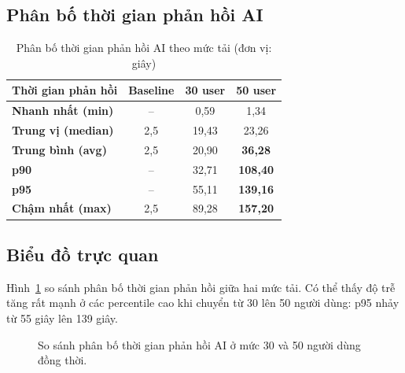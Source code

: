 \documentclass[12pt,a4paper]{article}
\newcommand{\bad}[1]{\textcolor{dangerred}{\bfseries #1}}
\begin{document}
\subsection{Phân bố thời gian phản hồi AI}

\begin{table}[H]
\centering
\caption{Phân bố thời gian phản hồi AI theo mức tải (đơn vị: giây)}
\begin{tabularx}{\textwidth}{>{\bfseries}Xccc}
\toprule
\rowcolor{lightblue}
Thời gian phản hồi & Baseline & 30 user & 50 user\\
\midrule
Nhanh nhất (min)   & --    & 0,59  & 1,34\\
Trung vị (median)  & 2,5   & 19,43 & 23,26\\
Trung bình (avg)   & 2,5   & 20,90 & \bad{36,28}\\
p90                & --    & 32,71 & \bad{108,40}\\
p95                & --    & 55,11 & \bad{139,16}\\
Chậm nhất (max)    & 2,5   & 89,28 & \bad{157,20}\\
\bottomrule
\end{tabularx}
\end{table}

\subsection{Biểu đồ trực quan}

Hình~\ref{fig:latency} so sánh phân bố thời gian phản hồi giữa hai mức tải. Có thể
thấy độ trễ tăng rất mạnh ở các percentile cao khi chuyển từ 30 lên 50 người dùng:
p95 nhảy từ 55 giây lên 139 giây.

\begin{figure}[H]
\centering
{}
\caption{So sánh phân bố thời gian phản hồi AI ở mức 30 và 50 người dùng đồng thời.}
\label{fig:latency}
\end{figure}
\end{document}
